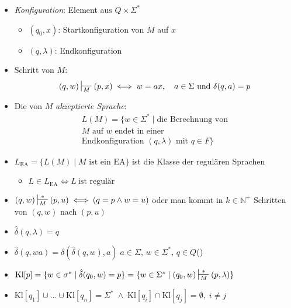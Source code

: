 \documentclass[a4paper,10pt]{article}
\begin{document}
\begin{itemize}
    \item \emph{Konfiguration}: Element aus $Q \times \Sigma^*$
    \begin{itemize}
        \item $(q_0, x)$: Startkonfiguration von $M$ auf $x$
        \item $(q, \lambda)$: Endkonfiguration
    \end{itemize}
    \item Schritt von $M$:
    \[(q, w) \sststile{M}{} (p, x) \iff w = ax,\quad a \in \Sigma\ \text{und}\ \delta(q, a) = p\]
    \item Die von $M$ \emph{akzeptierte Sprache}:
    \begin{multline*}
        L(M) = \{w \in \Sigma^*\; |\; \text{die Berechnung von}\\
        \text{$M$ auf $w$ endet in einer}\\
        \text{Endkonfiguration $(q, \lambda)$ mit $q \in F$}\}
    \end{multline*}
    \item $L_\textrm{EA} = \{L(M)\; |\; \text{$M$ ist ein EA\}}$ ist die Klasse der regulären Sprachen
    \begin{itemize}
        \item[\hookrightarrow] $L \in L_\textrm{EA} \iff L\ \text{ist regulär}$
    \end{itemize}
    \item $(q, w) \sststile{M}{*} (p, u) \iff (q = p \land w = u)$ oder man kommt in $k \in \mathbb{N}^+$ Schritten von $(q, w)$ nach $(p, u)$
    \item $\hat{\delta}(q, \lambda) = q$
    \item $\hat{\delta}(q, wa) = \delta(\hat{\delta}(q, w), a)\; a \in \Sigma,\, w \in \Sigma^*,\, q \in Q$\quad()
    \item $\textrm{Kl}[p] = \{w \in \sigma^*\; |\; \hat{\delta}(q_0, w) = p\} = \{w \in \Sigma^*\; |\; (q_0, w) \sststile{M}{*} (p, \lambda)\}$
    \item $\textrm{Kl}[q_1] \cup \dots \cup \textrm{Kl}[q_n] = \Sigma^* \;\land\; \textrm{Kl}[q_i] \cap \textrm{Kl}[q_j] = \emptyset,\; i \neq j$
\end{itemize}
\end{document}
